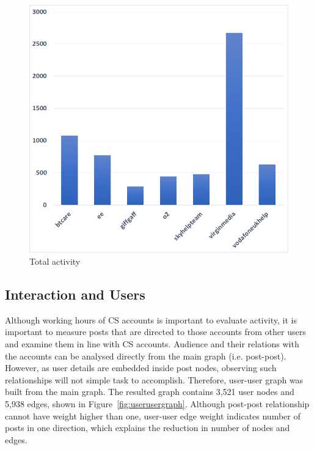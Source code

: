 \documentclass[sigconf]{acmart}
\begin{document}
\begin{figure}[htb]
\centering
\includegraphics[width=\columnwidth]{images/totalactivity.png}
\caption{Total activity}
\label{fig:totalactivity}
\end{figure}


\subsection{Interaction and Users}

Although working hours of CS accounts is important to evaluate
activity, it is important to measure posts that are directed to those
accounts from other users and examine them in line with CS
accounts. Audience and their relations with the accounts can be
analysed directly from the main graph (i.e. post-post). However, as
user details are embedded inside post nodes, observing such
relationships will not simple task to accomplish. Therefore, user-user
graph was built from the main graph. The resulted graph contains 3,521
user nodes and 5,938 edges, shown in
Figure~\ref{fig:userusergraph}. Although post-post relationship cannot
have weight higher than one, user-user edge weight indicates number of
posts in one direction, which explains the reduction in number of
nodes and edges.
\end{document}
